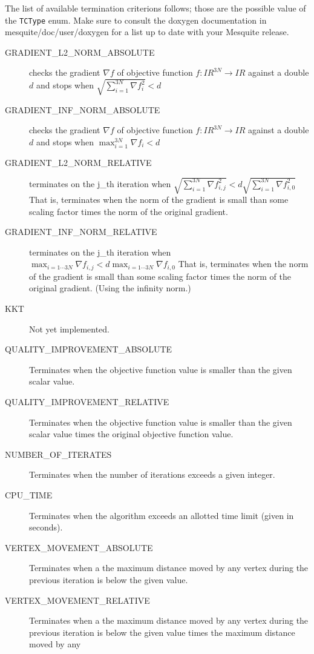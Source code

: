 The list of available termination criterions follows; those are the possible value of the
\texttt{TCType} enum. Make sure to consult the doxygen documentation
in mesquite/doc/user/doxygen for a list up to date with your Mesquite release. 
\begin{description}
\item[GRADIENT\_\-L2\_\-NORM\_\-ABSOLUTE] checks the gradient $\nabla f $ of objective function  $f
: I\!\!R^{3N} \rightarrow I\!\!R $ against a double $d$  and stops when $\sqrt{\sum_{i=1}^{3N}\nabla
f_i^2}<d$
\item[GRADIENT\_\-INF\_\-NORM\_\-ABSOLUTE]
checks the gradient $\nabla f $ of objective function  $f : I\!\!R^{3N} \rightarrow I\!\!R $ against
a double $d$  and stops when $ \max_{i=1}^{3N} \nabla f_i < d $ 
\item[GRADIENT\_\-L2\_\-NORM\_\-RELATIVE]terminates on the j\_\-th iteration when
$\sqrt{\sum_{i=1}^{3N}\nabla f_{i,j}^2}<d\sqrt{\sum_{i=1}^{3N}\nabla f_{i,0}^2}$ That is, terminates
when the norm of the gradient is small than some scaling factor times the norm of the original
gradient. 
\item[GRADIENT\_\-INF\_\-NORM\_\-RELATIVE]terminates on the j\_\-th iteration when $\max_{i=1 \cdots
3N}\nabla f_{i,j}<d \max_{i=1 \cdots 3N}\nabla f_{i,0}$ That is, terminates when the norm of the
gradient is small than some scaling factor times the norm of the original gradient. (Using the
infinity norm.) 
\item[KKT] Not yet implemented.
\item[QUALITY\_\-IMPROVEMENT\_\-ABSOLUTE] Terminates when the objective function value is smaller
than the given scalar value.
\item[QUALITY\_\-IMPROVEMENT\_\-RELATIVE] Terminates when the objective function value is smaller
than the given scalar value times the original objective function value. 
\item[NUMBER\_\-OF\_\-ITERATES] Terminates when the number of iterations exceeds a given integer.
\item[CPU\_\-TIME] Terminates when the algorithm exceeds an allotted time limit (given in seconds). 
\item[VERTEX\_\-MOVEMENT\_\-ABSOLUTE] Terminates when a the maximum distance moved by any vertex
during the previous iteration is below the given value. 
\item[VERTEX\_\-MOVEMENT\_\-RELATIVE] Terminates when a the maximum distance moved by any vertex
during the previous iteration is below the given value times the maximum distance moved by any

\end{description}
